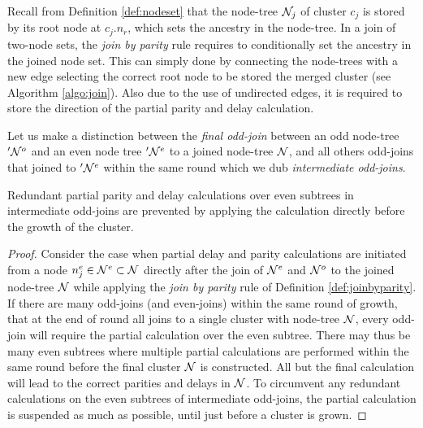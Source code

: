 Recall from Definition \ref{def:nodeset} that the node-tree $\mathcal{N}_j$ of cluster $c_j$ is stored by its root node at $c_j.n_r$, which sets the ancestry in the node-tree. In a join of two-node sets, the \emph{join by parity} rule requires to conditionally set the ancestry in the joined node set. This can simply done by connecting the node-trees with a new edge selecting the correct root node to be stored the merged cluster (see Algorithm \ref{algo:join}). Also due to the use of undirected edges, it is required to store the direction of the partial parity and delay calculation.

\begin{definition}
  Let us make a distinction between the \emph{final odd-join} between an odd node-tree $'\mathcal{N}^o$ and an even node tree $'\mathcal{N}^e$ to a joined node-tree $\mathcal{N}$, and all others odd-joins that joined to $'\mathcal{N}^e$ within the same round which we dub \emph{intermediate odd-joins}. 
\end{definition}

\begin{lemma}\label{lem:delaywhengrown}
  Redundant partial parity and delay calculations over even subtrees in intermediate odd-joins are prevented by applying the calculation directly before the growth of the cluster. 
\end{lemma}
\begin{proof}
  Consider the case when partial delay and parity calculations are initiated from a node $n_j^e \in \mathcal{N}^e \subset \mathcal{N}$ directly after the join of $\mathcal{N}^e$ and $\mathcal{N}^o$ to the joined node-tree $\mathcal{N}$ while applying the \emph{join by parity} rule of Definition \ref{def:joinbyparity}. If there are many odd-joins (and even-joins) within the same round of growth, that at the end of round all joins to a single cluster with node-tree $\mathcal{N}$, every odd-join will require the partial calculation over the even subtree. There may thus be many even subtrees where multiple partial calculations are performed within the same round before the final cluster $\mathcal{N}$ is constructed. All but the final calculation will lead to the correct parities and delays in $\mathcal{N}$. To circumvent any redundant calculations on the even subtrees of intermediate odd-joins, the partial calculation is suspended as much as possible, until just before a cluster is grown.
\end{proof}

